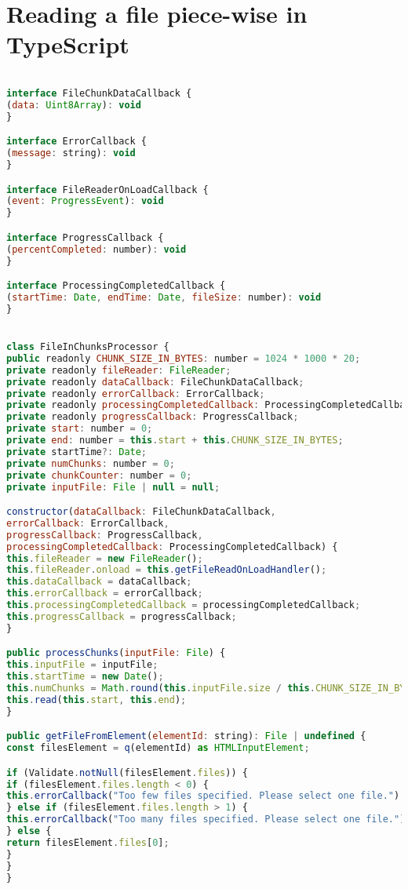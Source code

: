 \section{Reading a file piece-wise in TypeScript}
\begin{lstlisting}[language=Javascript]

interface FileChunkDataCallback {
(data: Uint8Array): void
}

interface ErrorCallback {
(message: string): void
}

interface FileReaderOnLoadCallback {
(event: ProgressEvent): void
}

interface ProgressCallback {
(percentCompleted: number): void
}

interface ProcessingCompletedCallback {
(startTime: Date, endTime: Date, fileSize: number): void
}


class FileInChunksProcessor {
public readonly CHUNK_SIZE_IN_BYTES: number = 1024 * 1000 * 20;
private readonly fileReader: FileReader;
private readonly dataCallback: FileChunkDataCallback;
private readonly errorCallback: ErrorCallback;
private readonly processingCompletedCallback: ProcessingCompletedCallback;
private readonly progressCallback: ProgressCallback;
private start: number = 0;
private end: number = this.start + this.CHUNK_SIZE_IN_BYTES;
private startTime?: Date;
private numChunks: number = 0;
private chunkCounter: number = 0;
private inputFile: File | null = null;

constructor(dataCallback: FileChunkDataCallback,
errorCallback: ErrorCallback,
progressCallback: ProgressCallback,
processingCompletedCallback: ProcessingCompletedCallback) {
this.fileReader = new FileReader();
this.fileReader.onload = this.getFileReadOnLoadHandler();
this.dataCallback = dataCallback;
this.errorCallback = errorCallback;
this.processingCompletedCallback = processingCompletedCallback;
this.progressCallback = progressCallback;
}

public processChunks(inputFile: File) {
this.inputFile = inputFile;
this.startTime = new Date();
this.numChunks = Math.round(this.inputFile.size / this.CHUNK_SIZE_IN_BYTES);
this.read(this.start, this.end);
}

public getFileFromElement(elementId: string): File | undefined {
const filesElement = q(elementId) as HTMLInputElement;

if (Validate.notNull(filesElement.files)) {
if (filesElement.files.length < 0) {
this.errorCallback("Too few files specified. Please select one file.")
} else if (filesElement.files.length > 1) {
this.errorCallback("Too many files specified. Please select one file.")
} else {
return filesElement.files[0];
}
}
}


\end{lstlisting}
